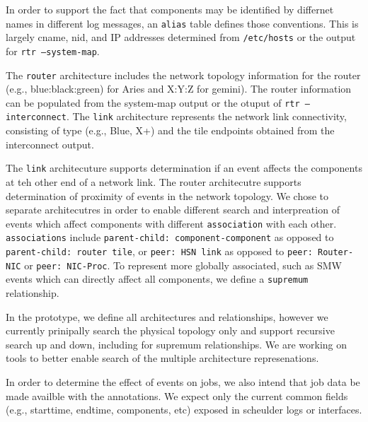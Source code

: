 In order to support the fact that components may be identified by differnet
names in different log messages, an \texttt{alias} table defines those conventions.
This is largely cname, nid, and IP addresses determined from \texttt{/etc/hosts}
or the output for \texttt{rtr --system-map}.

The \texttt{router} architecture includes the network topology information
for the router (e.g., blue:black:green)
for Aries and X:Y:Z for gemini). The router information can be populated from
the system-map output or the otuput of \texttt{rtr --interconnect}.
The \texttt{link} architecture represents the network link connectivity,
consisting of type (e.g., Blue, X+) and the tile endpoints obtained
from the interconnect output.

The \texttt{link} architecuture supports determination if an event affects the
components at teh other end of a network link. The router architecutre
supports determination of proximity of events in the network topology.
We chose to separate architecutres in order to enable different
search and interpreation of events which affect components with
different \texttt{association} with each other. \texttt{associations}
include \texttt{parent-child: component-component} as opposed to
\texttt{parent-child: router tile}, or \texttt{peer: HSN link}
as opposed to \texttt{peer: Router-NIC} or \texttt{peer: NIC-Proc}.
To represent more globally associated, such as SMW
events which can directly affect all components, we define
a \texttt{supremum} relationship.

In the prototype, we define all architectures and relationships,
however we currently prinipally search the physical topology only
and support recursive search up and down, including for supremum
relationships. We are working on tools to better enable search of
the multiple architecture represenations.

In order to determine the effect of events on jobs, we also
intend that job data be made availble with the annotations.
We expect only the current common fields (e.g., starttime,
endtime, components, etc) exposed in scheulder logs or
interfaces.







